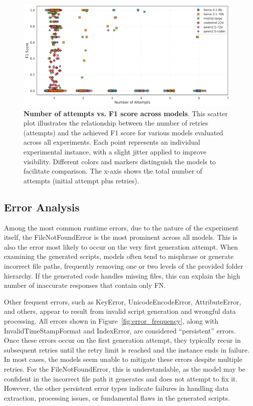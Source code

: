\documentclass{DESSThesis}
\begin{document}
\begin{figure}[ht]
    \centering
    \includegraphics[width=\linewidth]{img/Results/First Experimental Phase/Number of Retries vs F1 Score.png}
    \caption[Number of attempts vs. F1 score across models]{\textbf{Number of attempts vs. F1 score across models}. This scatter plot illustrates the relationship between the number of retries (attempts) and the achieved F1 score for various models evaluated across all experiments. Each point represents an individual experimental instance, with a slight jitter applied to improve visibility. Different colors and markers distinguish the models to facilitate comparison. The x-axis shows the total number of attempts (initial attempt plus retries).}
    \label{fig:retries_vs_F1}
\end{figure}

\subsection{Error Analysis} \label{RAG_error_analysis}

Among the most common runtime errors, due to the nature of the experiment itself, the FileNotFoundError is the most prominent across all models. This is also the error most likely to occur on the very first generation attempt. When examining the generated scripts, models often tend to misphrase or generate incorrect file paths, frequently removing one or two levels of the provided folder hierarchy. If the generated code handles missing files, this can explain the high number of inaccurate responses that contain only FN. 

Other frequent errors, such as KeyError, UnicodeEncodeError, AttributeError, and others, appear to result from invalid script generation and wrongful data processing. All errors shown in Figure~\ref{fig:error_frequency}, along with InvalidTimeStampFormat and IndexError, are considered “persistent” errors. Once these errors occur on the first generation attempt, they typically recur in subsequent retries until the retry limit is reached and the instance ends in failure. In most cases, the models seem unable to mitigate these errors despite multiple retries. For the FileNotFoundError, this is understandable, as the model may be confident in the incorrect file path it generates and does not attempt to fix it. However, the other persistent error types indicate failures in handling data extraction, processing issues, or fundamental flaws in the generated scripts.
\end{document}
